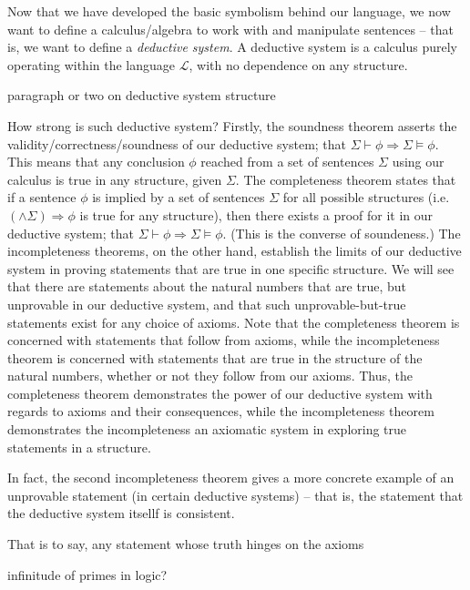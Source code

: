 \documentclass{article}
\theoremstyle{definition}
\begin{document}
Now that we have developed the basic symbolism behind our language, we now want to define a calculus/algebra to work with and manipulate sentences -- that is, we want to define a \emph{deductive system}. A deductive system is a calculus purely operating within the language $\mathcal{L}$, with no dependence on any structure. \par

paragraph or two on deductive system structure ~ \par

How strong is such deductive system? Firstly, the soundness theorem asserts the validity/correctness/soundness of our deductive system; that $\Sigma\vdash\phi\Rightarrow\Sigma\models\phi$. This means that any conclusion $\phi$ reached from a set of sentences $\Sigma$ using our calculus is true in any structure, given $\Sigma$.
The completeness theorem states that if a sentence $\phi$ is implied by a set of sentences $\Sigma$ for all possible structures (i.e. $(\land \Sigma)\Rightarrow\phi$ is true for any structure), then there exists a proof for it in our deductive system; that $\Sigma\vdash\phi\Rightarrow\Sigma\models\phi$. (This is the converse of soundeness.) The incompleteness theorems, on the other hand, establish the limits of our deductive system in proving statements that are true in one specific structure. We will see that there are statements about the natural numbers that are true, but unprovable in our deductive system, and that such unprovable-but-true statements exist for any choice of axioms. Note that the completeness theorem is concerned with statements that follow from axioms, while the incompleteness theorem is concerned with statements that are true in the structure of the natural numbers, whether or not they follow from our axioms. Thus, the completeness theorem demonstrates the power of our deductive system with regards to axioms and their consequences, while the incompleteness theorem demonstrates the incompleteness an axiomatic system in exploring true statements in a structure.\par

In fact, the second incompleteness theorem gives a more concrete example of an unprovable statement (in certain deductive systems) -- that is, the statement that the deductive system itsellf is consistent.

That is to say, any statement whose truth hinges on the axioms 

infinitude of primes in logic?
\end{document}
